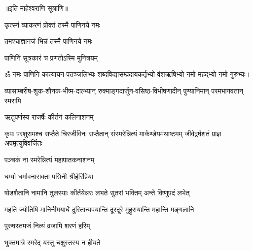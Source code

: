 \begin{center}
॥इति माहेश्वराणि सूत्राणि॥


{कृत्स्नं व्याकरणं प्रोक्तं तस्मै पाणिनये नमः}

{तमश्चाज्ञानजं भिन्नं तस्मै पाणिनये नमः}

{पाणिनिं सूत्रकारं च प्रणतोऽस्मि मुनित्रयम्}

ॐ नमः पाणिनि-कात्यायन-पतञ्जलिभ्यः शब्दविद्यासम्प्रदायकर्तृभ्यो वंशऋषिभ्यो नमो महद्भ्यो नमो गुरुभ्यः। 




{व्यासाम्बरीष-शुक-शौनक-भीष्म-दाल्भ्यान्}
{रुक्माङ्गदार्जुन-वसिष्ठ-विभीषणादीन्}
{पुण्यानिमान् परमभागवतान् स्मरामि}


{ऋतुपर्णस्य राजर्षेः कीर्तनं कलिनाशनम्}

{कृपः परशुरामश्च सप्तैते चिरजीविनः}
{सप्तैतान् संस्मरेन्नित्यं मार्कण्डेयमथाष्टमम्}
{जीवेद्वर्षशतं प्राज्ञ अपमृत्युविवर्जितः}

{पञ्चकं ना स्मरेन्नित्यं महापातकनाशनम्}




{धर्म्या धर्मावनासक्ता पद्मिनी श्रीर्हरिप्रिया}

{षोडशैतानि नामानि तुलस्याः कीर्तयेन्नरः}
{लभते सुतरां भक्तिम् अन्ते विष्णुपदं लभेत्}

{महति ज्योतिषि मानिनीमयार्धे}
{दुरितान्यपयान्ति दूरदूरे}
{मुहुरायान्ति महान्ति मङ्गलानि}


{पुरुषस्तमजं नित्यं व्रजामि शरणं हरिम्}


{भुक्तमात्रे स्मरेद् यस्तु चक्षुस्तस्य न हीयते}


\end{center}
